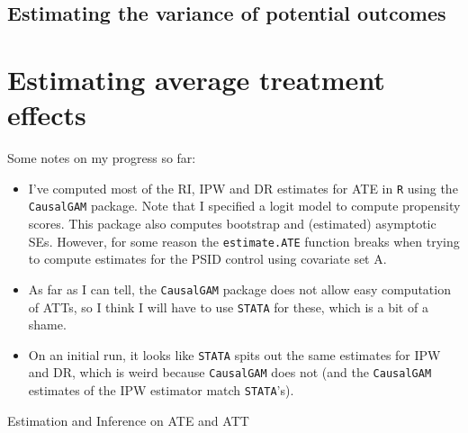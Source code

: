 \documentclass[12pt]{article}
\begin{document}
\subsection{Estimating the variance of potential outcomes}


\newpage
\section{Estimating average treatment effects}

Some notes on my progress so far:
\begin{itemize}
\item I've computed most of the RI, IPW and DR estimates for ATE in \verb|R| using the \verb|CausalGAM| package. Note that I specified a logit model to compute propensity scores. This package also computes bootstrap and (estimated) asymptotic SEs. However, for some reason the \verb|estimate.ATE| function breaks when trying to compute estimates for the PSID control using covariate set A.
\item As far as I can tell, the \verb|CausalGAM| package does not allow easy computation of ATTs, so I think I will have to use \verb|STATA| for these, which is a bit of a shame.
\item On an initial run, it looks like \verb|STATA| spits out the same estimates for IPW and DR, which is weird because \verb|CausalGAM| does not (and the \verb|CausalGAM| estimates of the IPW estimator match \verb|STATA|'s).
\end{itemize}


\begin{landscape}
\begin{table}
\centering
\caption{Estimation and Inference on ATE and ATT}\label{tab:tableQ2}
\vspace{-.1in}\resizebox{\columnwidth}{!}{
\subfloat[][ATE]{}\quad
\subfloat[][ATT]{}
}
\end{table}
\end{landscape}

\newpage
\end{document}
